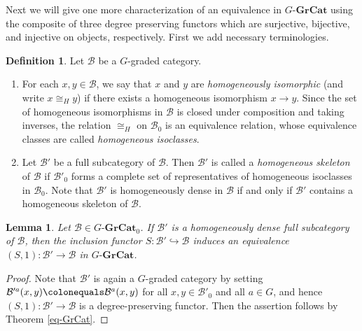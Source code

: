 \documentclass{surv-l}
\numberwithin{equation}{chapter}
\numberwithin{figure}{chapter}
\theoremstyle{plain}
\newtheorem{lem}[thm]{Lemma}
\theoremstyle{definition}
\newtheorem{dfn}[thm]{Definition}
\theoremstyle{remark}
\newcommand{\GGrCat}{G\text{-}\mathbf{GrCat}}
\begin{document}
Next we will give one more characterization of an equivalence in $\GGrCat$
using the composite of three degree preserving functors which are surjective, bijective, and injective on objects,
respectively.
First we add necessary terminologies.\pagebreak 

\begin{dfn}
Let $\mathcal{B}$ be a $G$-graded category.
\begin{enumerate}
\item
For each $x, y \in \mathcal{B}$, we say that $x$ and $y$ are \emph{homogeneously isomorphic}
(and write $x \cong_H y$) if there exists a homogeneous isomorphism $x \to y$.
Since the set of homogeneous isomorphisms in $\mathcal{B}$ is closed under composition
and taking inverses, the relation $\cong_H$ on $\mathcal{B}_0$ is an equivalence relation,
whose equivalence classes are called \emph{homogeneous isoclasses}.
\item
Let $\mathcal{B}'$ be a full subcategory of $\mathcal{B}$.
Then $\mathcal{B}'$ is called a \emph{homogeneous skeleton} of $\mathcal{B}$
if $\mathcal{B}'_0$ forms a complete set of representatives of homogeneous isoclasses
in $\mathcal{B}_0$.
Note that $\mathcal{B}'$ is homogeneously dense in $\mathcal{B}$ if and only if
$\mathcal{B}'$ contains a homogeneous skeleton of $\mathcal{B}$.
\end{enumerate}
\end{dfn}

\begin{lem}\label{lem:hmg-dense}
Let $\mathcal{B} \in \GGrCat_0$.
If $\mathcal{B}'$ is a homogeneously dense full subcategory of $\mathcal{B}$,
then the inclusion functor $S \colon \mathcal{B}' \hookrightarrow \mathcal{B}$ induces an equivalence
$(S, 1) \colon \mathcal{B}' \to \mathcal{B}$ in $\GGrCat$.
\end{lem}

\begin{proof}
Note that $\mathcal{B}'$ is again a $G$-graded category by setting
$\mathcal{B}'^a(x, y)\colonequals  \mathcal{B}^a(x, y)$ for all $x, y \in \mathcal{B}'_0$ and all $a \in G$, and hence
$(S, 1) \colon \mathcal{B}' \to \mathcal{B}$ is a degree-preserving functor.
Then the assertion follows by Theorem \ref{eq-GrCat}.
\end{proof}
\end{document}
